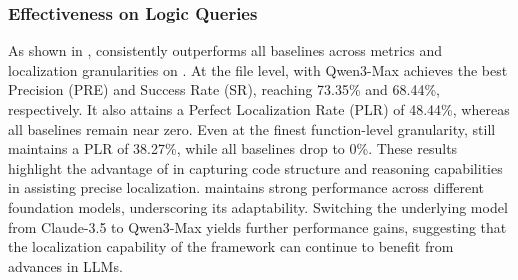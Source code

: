 \subsubsection{Effectiveness on Logic Queries}

As shown in , \tooldataloc consistently outperforms all baselines across metrics and localization granularities on \dataset. At the file level, \tooldataloc with Qwen3-Max achieves the best Precision (PRE) and Success Rate (SR), reaching 73.35\% and 68.44\%, respectively. It also attains a Perfect Localization Rate (PLR) of 48.44\%, whereas all baselines remain near zero. Even at the finest function-level granularity, \tooldataloc still maintains a PLR of 38.27\%, while all baselines drop to 0\%. These results highlight the advantage of \tooldataloc in capturing code structure and reasoning capabilities in assisting precise localization. \tooldataloc maintains strong performance across different foundation models, underscoring its adaptability. Switching the underlying model from Claude-3.5 to Qwen3-Max yields further performance gains, suggesting that the localization capability of the framework can continue to benefit from advances in LLMs.

